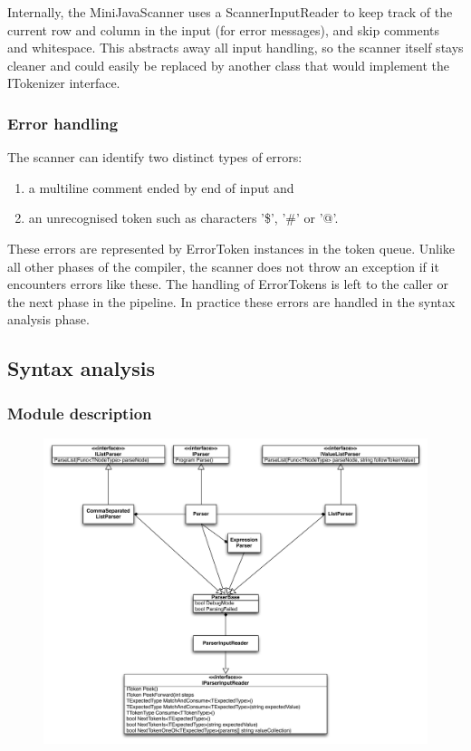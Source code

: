 \documentclass[a4paper,11pt]{article}
\begin{document}
Internally, the MiniJavaScanner uses a ScannerInputReader to keep track of the current row and column in the input (for error messages), and skip comments and whitespace. This abstracts away all input handling, so the scanner itself stays cleaner and could easily be replaced by another class that would implement the ITokenizer interface.

\subsubsection{Error handling}

The scanner can identify two distinct types of errors:
\begin{enumerate}
\item a multiline comment ended by end of input and
\item an unrecognised token such as characters '\$', '\#' or '@'.
\end{enumerate}

These errors are represented by ErrorToken instances in the token queue. Unlike all other phases of the compiler, the scanner does not throw an exception if it encounters errors like these. The handling of ErrorTokens is left to the caller or the next phase in the pipeline. In practice these errors are handled in the syntax analysis phase.

\subsection{Syntax analysis}

\subsubsection{Module description}

\begin{figure}[h!]
\centering
\includegraphics[width=1.0\textwidth]{syntax_analysis.pdf}
\end{figure}
\end{document}
